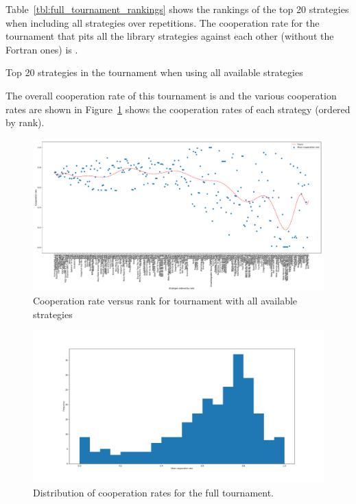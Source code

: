 \documentclass{article}
\begin{document}
Table~\ref{tbl:full_tournament_rankings}
shows the rankings of the top 20 strategies when including all strategies over
repetitions.
The cooperation rate for the tournament that pits all the library strategies
against each other (without the Fortran ones) is
\unskip.

\begin{table}[!hbtp]
        \centering
        \footnotesize
        
        \caption{Top 20 strategies in the tournament when using all available
        strategies}
        \label{tbl:full_tournament_rankings}
\end{table}

The overall cooperation rate of this tournament is
and the various
cooperation rates are shown in
Figure~\ref{fig:full_tournament_cooperation_rate_versus_rank} shows the
cooperation rates of each strategy (ordered by rank).

\begin{figure}[!hbtp]
    \centering
    \includegraphics[width=.8\textwidth]{assets/full_tournament_cooperation_rate_versus_rank.pdf}
    \caption{Cooperation rate versus rank for tournament with all available
    strategies}
    \label{fig:full_tournament_cooperation_rate_versus_rank}
\end{figure}

\begin{figure}[!hbtp]
    \centering
    \includegraphics[width=.8\textwidth]{assets/full_tournament_cooperation_rates.pdf}
    \caption{Distribution of cooperation rates for the full tournament.}
    \label{fig:full_tournament_cooperation_rates}
\end{figure}
\end{document}
